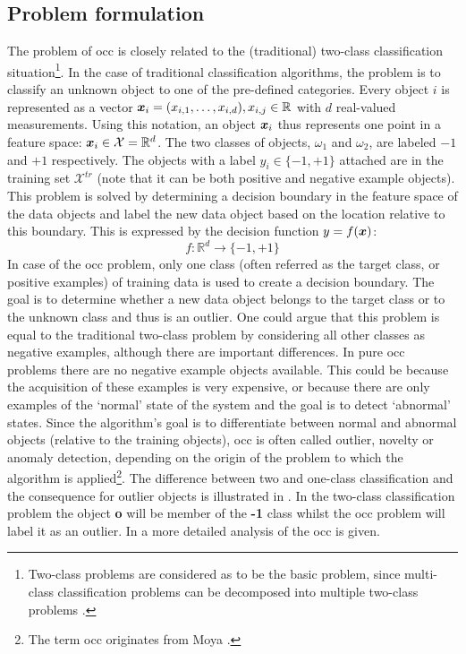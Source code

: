 \subsection{Problem formulation}\label{subsec:occ-problem-formulation}
The problem of \gls{occ} is closely related to the (traditional) two-class classification situation\footnote{Two-class problems are considered as to be the basic problem, since multi-class classification problems can be decomposed into multiple two-class problems \cite{fukunaga1990introduction}.}.
In the case of traditional classification algorithms, the problem is to classify an unknown object to one of the pre-defined categories.
Every object $i$ is represented as a vector $\vectorsym{x}_i = (x_{i,1},\dots,x_{i,d}), x_{i,j} \in \mathbb{R}$ with $d$ real-valued measurements.
Using this notation, an object $\vectorsym{x}_i$ thus represents one point in a feature space: $\vectorsym{x}_i \in \mathcal{X} = \mathbb{R}^d$.
The two classes of objects, $\omega_1$ and $\omega_2$, are labeled $-1$ and $+1$ respectively.
The objects with a label $y_i \in \{-1, +1\}$ attached are in the training set $\mathcal{X}^{tr}$ (note that it can be both positive and negative example objects).
This problem is solved by determining a decision boundary in the feature space of the data objects and label the new data object based on the location relative to this boundary.
This is expressed by the decision function $y = f(\vectorsym{x})$:
\begin{equation}\label{eq:decision_function_classification}
  f: \mathbb{R}^d \rightarrow \{-1, +1\}
\end{equation}
In case of the \gls{occ} problem, only one class (often referred as the target class, or positive examples) of training data is used to create a decision boundary.
The goal is to determine whether a new data object belongs to the target class or to the unknown class and thus is an outlier.
One could argue that this problem is equal to the traditional two-class problem by considering all other classes as negative examples, although there are important differences.
In pure \gls{occ} problems there are no negative example objects available.
This could be because the acquisition of these examples is very expensive, or because there are only examples of the `normal' state of the system and the goal is to detect `abnormal' states.
Since the algorithm's goal is to differentiate between normal and abnormal objects (relative to the training objects), \gls{occ} is often called outlier, novelty or anomaly detection, depending on the origin of the problem to which the algorithm is applied\footnote{The term \acrlong{occ} originates from Moya \etal \cite{moya1993one}.}.
The difference between two and one-class classification and the consequence for outlier objects is illustrated in .
In the two-class classification problem the object \textbf{o} will be member of the \textbf{-1} class whilst the \gls{occ} problem will label it as an outlier.
In \cite{tax2001one} a more detailed analysis of the \gls{occ} is given.

